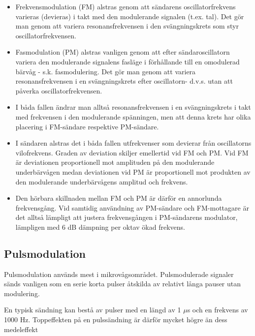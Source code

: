 \begin{itemize}
\item Frekvensmodulation (FM) alstras genom att sändarens oscillatorfrekvens
varieras (devieras) i takt med den modulerande signalen (t.ex. tal). Det gör man
genom att variera resonansfrekvensen i den svängningskrets som styr
oscillatorfrekvensen.

\item Fasmodulation (PM) alstras vanligen genom att efter sändaroscillatorn
variera den modulerande signalens fasläge i förhållande till en omodulerad
bärvåg - s.k. fasmodulering. Det gör man genom att variera resonansfrekvensen i
en svängningskrets efter oscillatorn- d.v.s. utan att påverka
oscillatorfrekvensen.

\item I båda fallen ändrar man alltså resonansfrekvensen i en svängningskrets i
takt med frekvensen i den modulerande spänningen, men att denna krets har olika
placering i FM-sändare respektive PM-sändare.

\item I sändaren alstras det i båda fallen utfrekvenser som devierar från
oscillatorns vilofrekvens. Graden av deviation skiljer emellertid vid FM och PM.
Vid FM är deviationen proportionell mot amplituden på den modulerande
underbärvågen medan deviationen vid PM är proportionell mot produkten av den
modulerande underbärvågens amplitud och frekvens.

\item Den hörbara skillnaden mellan FM och PM är därför en annorlunda
frekvensgång. Vid samtidig användning av PM-sändare och FM-mottagare är det
alltså lämpligt att justera frekvensgången i PM-sändarens modulator, lämpligen
med 6 dB dämpning per oktav ökad frekvens.
\end{itemize}

\subsection{Pulsmodulation}

Pulsmodulation används mest i mikrovågsområdet. Pulsmodulerade signaler sänds
vanligen som en serie korta pulser åtskilda av relativt långa pauser utan
modulering.

En typisk sändning kan bestå av pulser med en längd av 1 \(\mu\)s och en
frekvens av 1000 Hz. Toppeffekten på en pulssändning är därför mycket högre än
dess medeleffekt

